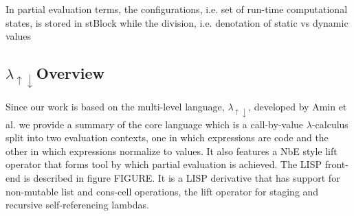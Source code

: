 \documentclass[fleqn]{article}
\theoremstyle{definition}
\newcommand{\mslang}{$\lambda_{\uparrow\downarrow}$}
\begin{document}
In partial evaluation terms, the configurations, i.e. set of run-time computational states, is stored in stBlock while the division, i.e. denotation of static vs dynamic values 

\subsection{\mslang Overview}
Since our work is based on the multi-level language, \mslang, developed by Amin et al. \cite{amin2017collapsing} we provide a summary of the core language which is a call-by-value $\lambda$-calculus split into two evaluation contexts, one in which expressions are code and the other in which expressions normalize to values. It also features a NbE style lift operator that forms tool by which partial evaluation is achieved. The LISP front-end is described in figure FIGURE. It is a LISP derivative that has support for non-mutable list and cons-cell operations, the lift operator for staging and recursive self-referencing lambdas.

\end{document}
